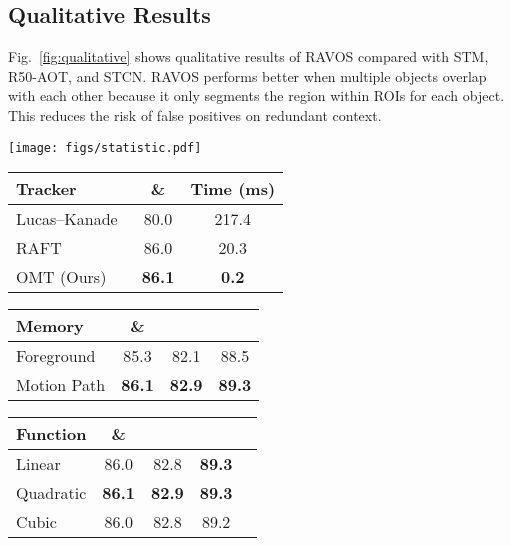 \documentclass[journal]{IEEEtran}
\begin{document}
\subsection{Qualitative Results}

Fig.~\ref{fig:qualitative} shows qualitative results of RAVOS compared with STM, R50-AOT, and STCN. RAVOS performs better when multiple objects overlap with each other because it only segments the region within ROIs for each object. This reduces the risk of false positives on redundant context.

 
\begin{figure*}[t]
\centering
\texttt{[image: figs/statistic.pdf]}
\caption{Processing time for different object sizes on YouTube-VOS 2018 validation set. (a) Average spatio-temporal feature matching and propagation time (ms) on different object sizes; (b) Average feature decoding time (ms) on different object sizes; (c) Distribution of object area ratio.} 
\label{fig:statistic}
\end{figure*}



\begin{table*}[t]
\centering
\begin{minipage}{.3\textwidth}
\centering
\caption{RAVOS performance using different trackers.} \label{tab:abtracker}
\begin{tabular}{lcc}
\toprule
Tracker &  \& &  Time (ms) \\
\midrule 
Lucas–Kanade~\cite{LUCAS} & 80.0 & 217.4 \\ 
RAFT~\cite{RAFT} & 86.0 & 20.3\\ 
OMT (Ours) & \textbf{86.1} & \textbf{0.2}\\
\bottomrule 
\end{tabular}
\end{minipage}
\hfill
\begin{minipage}{.3\textwidth}
\centering
\caption{RAVOS performance using different memory regions.} \label{tab:memregion}
\begin{tabular}{lccc}
\toprule 
Memory &  \& &   &    \\
\midrule 
Foreground & 85.3 & 82.1 & 88.5  \\ 
Motion Path & \textbf{86.1} & \textbf{82.9} & \textbf{89.3} \\ 
\bottomrule 
\end{tabular}
\end{minipage}
\hfill
\begin{minipage}{.3\textwidth}
\centering
\caption{RAVOS performance using different motion functions.} \label{tab:aborder}
\begin{tabular}{lcccc}
\toprule 
Function &  \& &   &   \\
\midrule 
Linear & 86.0 & 82.8 & \textbf{89.3} \\
Quadratic & \textbf{86.1} & \textbf{82.9} & \textbf{89.3} \\
Cubic & 86.0 & 82.8 & 89.2 \\
\bottomrule 
\end{tabular}
\end{minipage}
\end{table*}
\end{document}

